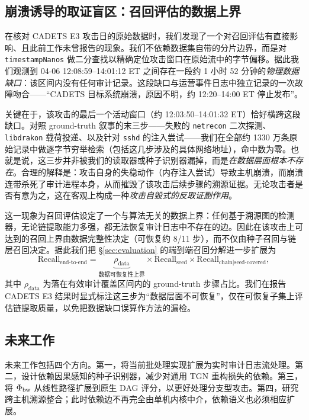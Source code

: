 \subsection{崩溃诱导的取证盲区：召回评估的数据上界}
\label{sec:forensic-ceiling}

在核对 CADETS E3 攻击日的原始数据时，我们发现了一个对召回评估有直接影响、且此前工作未曾报告的现象。我们不依赖数据集自带的分片边界，而是对 \texttt{timestampNanos} 做二分查找以精确定位攻击窗口在原始流中的字节偏移。据此我们观测到 04-06 12:08:59--14:01:12 ET 之间存在一段约 1 小时 52 分钟的\emph{物理数据缺口}：该区间内没有任何审计记录。这段缺口与运营事件日志中独立记录的一次故障吻合——``CADETS 目标系统崩溃，原因不明，约 12:20--14:00 ET 停止发布''。

关键在于，该攻击的最后一个活动窗口（约 12:03:50--14:01:32 ET）恰好横跨这段缺口。对照 ground-truth 叙事的末三步——失败的 \texttt{netrecon} 二次探测、\texttt{libdrakon} 载荷投递、以及针对 \texttt{sshd} 的注入尝试——我们在全部约 1330 万条原始记录中做逐字节穷举检索（包括这几步涉及的具体网络地址），命中数为零。也就是说，这三步并非被我们的读取器或种子识别器漏掉，而是\emph{在数据层面根本不存在}。合理的解释是：攻击自身的失稳动作（内存注入尝试）导致主机崩溃，而崩溃连带杀死了审计进程本身，从而摧毁了该攻击后续步骤的溯源证据。无论攻击者是否有意为之，这在客观上构成一种\emph{攻击自毁式的反取证副作用}。

这一现象为召回评估设定了一个与算法无关的数据上界：任何基于溯源图的检测器，无论链提取能力多强，都无法恢复审计日志中不存在的边。因此在该攻击上可达到的召回上界由数据完整性决定（可恢复约 8/11 步），而不仅由种子召回与链层召回决定。据此我们把 \S\ref{sec:evaluation} 的端到端召回分解进一步扩展为
\[
\mathrm{Recall}_{\text{end-to-end}}
= \underbrace{\rho_{\text{data}}}_{\text{数据可恢复性上界}}
\times \mathrm{Recall}_{\text{seed}}
\times \mathrm{Recall}_{\text{chain}\mid\text{seed-covered}},
\]
其中 $\rho_{\text{data}}$ 为落在有效审计覆盖区间内的 ground-truth 步骤占比。我们在报告 CADETS E3 结果时显式标注这三步为``数据层面不可恢复''，仅在可恢复子集上评估链提取质量，以免把数据缺口误算作方法的漏检。

\subsection{未来工作}

未来工作包括四个方向。第一，将当前批处理实现扩展为实时审计日志流处理。第二，设计依赖因果感知的种子识别器，减少对通用 TGN 重构损失的依赖。第三，将 $\Phi_{\text{bw}}$ 从线性路径扩展到原生 DAG 评分，以更好处理分支型攻击。第四，研究跨主机溯源整合；此时依赖边不再完全由单机内核中介，依赖语义也必须相应扩展。
